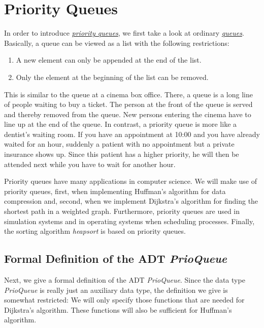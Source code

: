 \chapter{Priority Queues \label{chap:prioqueue}}
In order to introduce \href{https://en.wikipedia.org/wiki/Priority_queue}{\emph{priority queues}},
we first take a look at ordinary
\href{https://en.wikipedia.org/wiki/Queue_(abstract_data_type)}{\emph{queues}}.
Basically, a queue can be viewed as a list with the following restrictions:
\begin{enumerate}
\item A new element can only be appended at the end of the list.
\item Only the element at the beginning of the list can be removed.
\end{enumerate}
This is similar to the queue at a cinema box office.  There, a queue is a long line of people
waiting to buy a ticket.  The person at the front of the queue is served and thereby removed from
the queue.  New persons entering the cinema have to line up at the end of the queue.  In contrast, a
priority queue is more like a dentist's waiting room.  If you have an appointment at 10:00 and you
have already waited for an hour, suddenly a patient with no appointment but a private insurance
shows up.  Since this patient has a higher priority, he will then be attended next while you have
to wait for another hour. 

Priority queues have many applications in computer science.  We will make use of priority queues,
first, when implementing Huffman's algorithm for data compression and, second, when we implement
Dijkstra's algorithm for finding the shortest path in a weighted graph.  Furthermore, priority
queues are used in simulation systems and in operating systems when scheduling processes.
Finally, the sorting algorithm \emph{heapsort} is based on priority queues.

\section[Formal Definition]{Formal Definition of the ADT \textsl{PrioQueue}}
Next, we give a formal definition of the ADT \textsl{PrioQueue}.  Since the data type
\textsl{PrioQueue} is really just an auxiliary data type, the definition we give is somewhat
restricted: We will only specify those functions that are needed for Dijkstra's algorithm.
These functions will also be sufficient for Huffman's algorithm.

